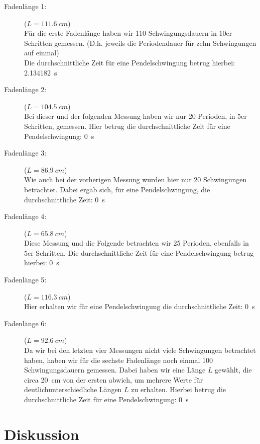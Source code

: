 \documentclass[11pt,a4paper,titlepage, ngerman]{article}
\begin{document}
			\begin{description}
				
				\item[Fadenlänge 1:]($L = \SI{111,6}{cm}$)\\
				Für die erste Fadenlänge haben wir 110 Schwingungsdauern in 10er Schritten gemessen. (D.h. jeweils die Periodendauer für zehn Schwingungen auf einmal) \\
				Die durchschnittliche Zeit für eine Pendelschwingung betrug hierbei: \SI{2.134182}{s}
				
				\item[Fadenlänge 2:]($L = \SI{104,5}{cm}$)\\ 				 
				Bei dieser und der folgenden Messung haben wir nur 20 Perioden, in 5er Schritten, gemessen. Hier betrug die durchschnittliche Zeit für eine Pendelschwingung: \SI{0}{s}
				
				\item[Fadenlänge 3:]($L = \SI{86,9}{cm}$)\\ 			
				Wie auch bei der vorherigen Messung wurden hier nur 20 Schwingungen betrachtet. Dabei ergab sich, für eine Pendelschwingung, die durchschnittliche Zeit: \SI{0}{s}		
				
				\item[Fadenlänge 4:]($L = \SI{65,8}{cm}$)\\ 				
				Diese Messung und die Folgende betrachten wir 25 Perioden, ebenfalls in 5er Schritten. Die durchschnittliche Zeit für eine Pendelschwingung betrug hierbei: \SI{0}{s}
				
				\item[Fadenlänge 5:]($L = \SI{116,3}{cm}$)\\ 				
				Hier erhalten wir für eine Pendelschwingung die durchschnittliche Zeit: \SI{0}{s}
				
				\item[Fadenlänge 6:]($L = \SI{92,6}{cm}$)\\ 				
				Da wir bei den letzten vier Messungen nicht viele Schwingungen betrachtet haben, haben wir für die sechste Fadenlänge noch einmal 100 Schwingungsdauern gemessen. Dabei haben wir eine Länge $L$ gewählt, die circa \SI{20}{cm} von der ersten abwich, um mehrere Werte für \glqq deutlich\grqq unterschiedliche Längen $L$ zu erhalten. 
				Hierbei betrug die durchschnittliche Zeit für eine Pendelschwingung: \SI{0}{s}
				
			\end{description}
		
	\section{Diskussion}	
		\label{Diskussion}		
		
\end{document}
